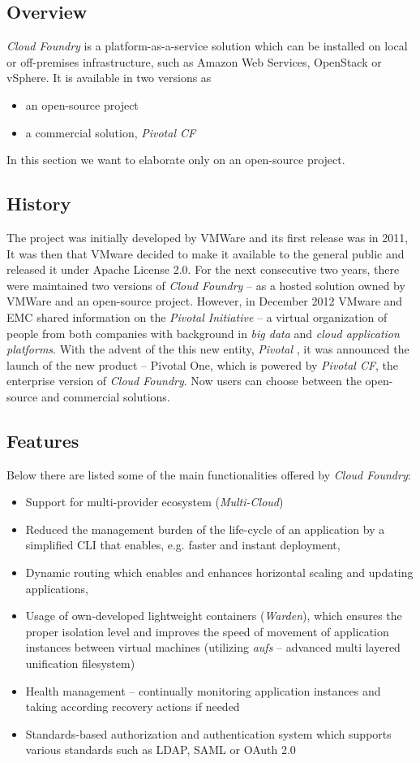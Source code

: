 \subsection{Overview}
\emph{Cloud Foundry} is a platform-as-a-service solution which can be installed on local or off-premises infrastructure, such as Amazon Web Services, OpenStack or vSphere. It is available in two versions as
\begin{itemize}
  \item an open-source project
  \item a commercial solution, \emph{Pivotal CF}
\end{itemize}
In this section we want to elaborate only on an open-source project.

\subsection{History}
The project was initially developed by VMWare and its first release was in 2011, It was then that VMware decided to make it available to the general public and released it under Apache License 2.0. For the next consecutive two years, there were maintained two versions of \emph{Cloud Foundry} -- as a hosted solution owned by VMWare and an open-source project. However, in December 2012 VMware and EMC shared information on the \emph{Pivotal Initiative} \cite{PivotalInitiative} -- a virtual organization of people from both companies with background in \emph{big data} and \emph{cloud application platforms}. With the advent of the this new entity, \emph{Pivotal} \cite{GoPivotal}, it was announced the launch of the new product -- Pivotal One, which is powered by \emph{Pivotal CF}, the enterprise version of \emph{Cloud Foundry}. Now users can choose between the open-source and commercial solutions.

\subsection{Features}
Below there are listed some of the main functionalities offered by \emph{Cloud Foundry}:
\begin{itemize}
  \item Support for multi-provider ecosystem (\emph{Multi-Cloud})
  \item Reduced the management burden of the life-cycle of an application by a simplified CLI that enables, e.g. faster and instant deployment,
  \item Dynamic routing which enables and enhances horizontal scaling and updating applications,
  \item Usage of own-developed lightweight containers (\emph{Warden}), which ensures the proper isolation level and improves the speed of movement of application instances between virtual machines (utilizing \emph{aufs} -- advanced multi layered unification filesystem)
  \item Health management -- continually monitoring application instances and taking according recovery actions if needed
  \item Standards-based authorization and authentication system which supports various standards such as LDAP, SAML or OAuth 2.0
\end{itemize}

